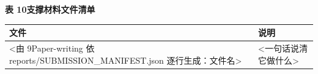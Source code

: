 %
%
%
%

\begin{tableblock}
{\small
  \setlength{\lineskiplimit}{0pt}%
  \setlength{\lineskip}{\baselineskip}%
  {\fontsize{10.5pt}{12.6pt}\bfseries 表 10\quad 支撑材料文件清单\par}
  \vspace{0.5em}%
  \renewcommand{\arraystretch}{1.0}%
  \begin{tabular}{@{}p{}p{}@{}}
    \toprule
    \textbf{文件} & \textbf{说明} \\
    \midrule
    <由 9Paper-writing 依 reports/SUBMISSION\_MANIFEST.json 逐行生成：文件名> & <一句话说清它做什么> \\
    \bottomrule
  \end{tabular}
}
\end{tableblock}
